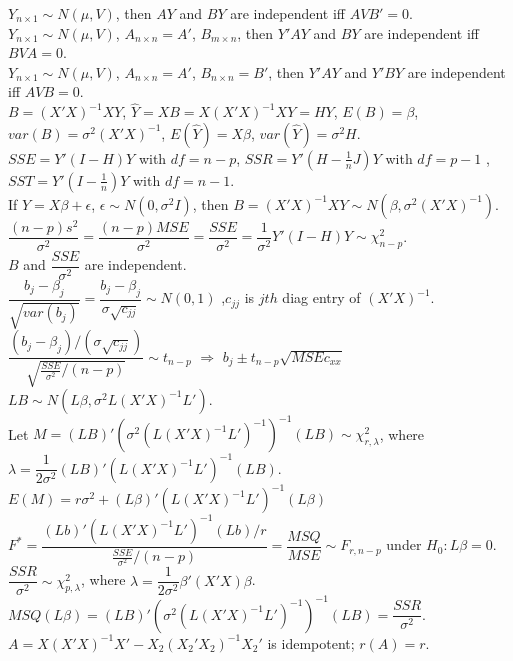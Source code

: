 \documentclass[10pt,landscape]{article}
\begin{document}
\begin{multicols}{3}
$Y_{n\times1}\sim N\left(\mu,V\right)$, then $AY$ and $BY$ are independent iff $AVB'=0$.\\
 $Y_{n\times1}\sim N\left(\mu,V\right)$, $A_{n\times n}=A'$, $B_{m\times n}$, then $Y'AY$ and $BY$ are independent iff $BVA=0$.\\
 $Y_{n\times1}\sim N\left(\mu,V\right)$, $A_{n\times n}=A'$, $B_{n\times n}=B'$, then $Y'AY$ and $Y'BY$ are independent iff $AVB=0$.\\
 $B=\left(X'X\right)^{-1}XY$, $\hat{Y}=XB=X\left(X'X\right)^{-1}XY=HY$, $E\left(B\right)=\beta$, $var\left(B\right)=\sigma^{2}\left(X'X\right)^{-1}$, $E\left(\hat{Y}\right)=X\beta$, $var\left(\hat{Y}\right)=\sigma^{2}H$.\\
 $SSE=Y'\left(I-H\right)Y$ with $df=n-p$, $SSR=Y'\left(H-\frac{1}{n}J\right)Y$ with $df=p-1$ , $SST=Y'\left(I-\frac{1}{n}\right)Y$ with $df=n-1$. \\
 If $Y=X\beta+\epsilon$, $\epsilon\sim N\left(0,\sigma^{2}I\right)$, then $B=\left(X'X\right)^{-1}XY\sim N\left(\beta,\sigma^{2}\left(X'X\right)^{-1}\right)$. \\
 $\dfrac{\left(n-p\right)s^{2}}{\sigma^{2}}=\dfrac{\left(n-p\right)MSE}{\sigma^{2}}=\dfrac{SSE}{\sigma^{2}}=\dfrac{1}{\sigma^{2}}Y'\left(I-H\right)Y\sim\chi_{n-p}^{2}$.\\
 $B$ and $\dfrac{SSE}{\sigma^{2}}$ are independent. \\
 $\dfrac{b_{j}-\beta_{j}}{\sqrt{var\left(b_{j}\right)}}=\dfrac{b_{j}-\beta_{j}}{\sigma\sqrt{c_{jj}}}\sim N\left(0,1\right)$ ,$c_{jj}$ is $jth$ diag entry of $\left(X'X\right)^{-1}$.\\
 $\dfrac{\left(b_{j}-\beta_{j}\right)/\left(\sigma\sqrt{c_{jj}}\right)}{\sqrt{\frac{SSE}{\sigma^{2}}/\left(n-p\right)}}\sim t_{n-p}$ $\Rightarrow$ $b_{j}\pm t_{n-p}\sqrt{MSEc_{xx}}$\\
 $LB\sim N\left(L\beta,\sigma^{2}L\left(X'X\right)^{-1}L'\right)$.\\
 Let $M=\left(LB\right)'\left(\sigma^{2}\left(L\left(X'X\right)^{-1}L'\right)^{-1}\right)^{-1}\left(LB\right)\sim\chi_{r,\lambda}^{2}$, where $\lambda=\dfrac{1}{2\sigma^{2}}\left(LB\right)'\left(L\left(X'X\right)^{-1}L'\right)^{-1}\left(LB\right)$.\\
 $E\left(M\right)=r\sigma^{2}+\left(L\beta\right)'\left(L\left(X'X\right)^{-1}L'\right)^{-1}\left(L\beta\right)$\\
 $F^{*}=\dfrac{\left(Lb\right)'\left(L\left(X'X\right)^{-1}L'\right)^{-1}\left(Lb\right)/r}{\frac{SSE}{\sigma^{2}}/\left(n-p\right)}=\dfrac{MSQ}{MSE}\sim F_{r,n-p}$ under $H_{0}:L\beta=0$.\\
 $\dfrac{SSR}{\sigma^{2}}\sim\chi_{p,\lambda}^{2}$, where $\lambda=\dfrac{1}{2\sigma^{2}}\beta'\left(X'X\right)\beta$.\\
 $MSQ\left(L\beta\right)=\left(LB\right)'\left(\sigma^{2}\left(L\left(X'X\right)^{-1}L'\right)^{-1}\right)^{-1}\left(LB\right)=\dfrac{SSR}{\sigma^{2}}$.\\
 $A=X\left(X'X\right)^{-1}X'-X_{2}\left(X_{2}'X_{2}\right)^{-1}X_{2}'$ is idempotent; $r\left(A\right)=r$.\\


\end{multicols}
\end{document}
